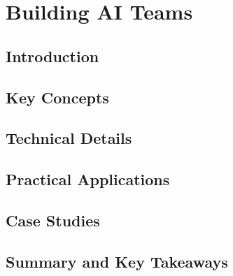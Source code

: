 ﻿%

\chapter{Building AI Teams}
\label{ch:chapter-24}

\section{Introduction}


\section{Key Concepts}


\section{Technical Details}


\section{Practical Applications}


\section{Case Studies}


\section{Summary and Key Takeaways}


